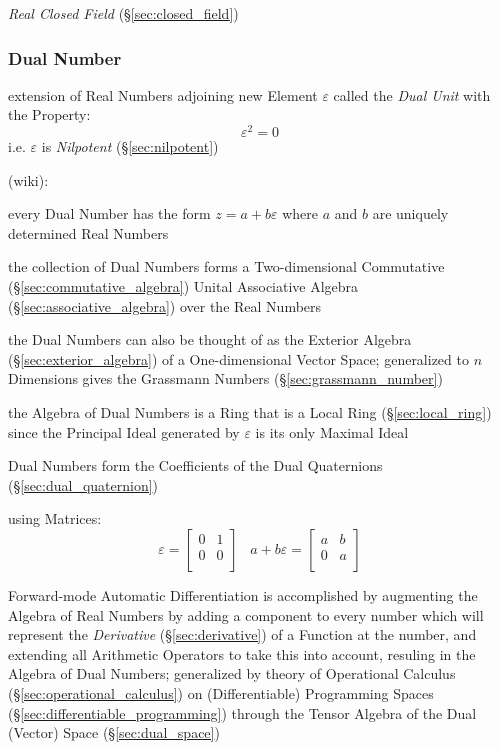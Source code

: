 \emph{Real Closed Field} (\S\ref{sec:closed_field})



\subsubsection{Dual Number}\label{sec:dual_number}

extension of Real Numbers adjoining new Element $\varepsilon$ called the
\emph{Dual Unit} with the Property:
\[
  \varepsilon^2 = 0
\]
i.e. $\varepsilon$ is \emph{Nilpotent} (\S\ref{sec:nilpotent})

(wiki):

every Dual Number has the form $z = a + b\varepsilon$ where $a$ and $b$ are
uniquely determined Real Numbers

the collection of Dual Numbers forms a Two-dimensional Commutative
(\S\ref{sec:commutative_algebra}) Unital Associative Algebra
(\S\ref{sec:associative_algebra}) over the Real Numbers

the Dual Numbers can also be thought of as the Exterior Algebra
(\S\ref{sec:exterior_algebra}) of a One-dimensional Vector Space; generalized to
$n$ Dimensions gives the Grassmann Numbers (\S\ref{sec:grassmann_number})

the Algebra of Dual Numbers is a Ring that is a Local Ring
(\S\ref{sec:local_ring}) since the Principal Ideal generated by $\varepsilon$ is
its only Maximal Ideal

Dual Numbers form the Coefficients of the Dual Quaternions
(\S\ref{sec:dual_quaternion})

using Matrices:
\[
  \varepsilon = \begin{bmatrix}
    0 & 1 \\
    0 & 0 \\
  \end{bmatrix}
  \;\;\;
  a + b\varepsilon = \begin{bmatrix}
    a & b \\
    0 & a \\
  \end{bmatrix}
\]

Forward-mode Automatic Differentiation is accomplished by augmenting the Algebra
of Real Numbers by adding a component to every number which will represent the
\emph{Derivative} (\S\ref{sec:derivative}) of a Function at the number, and
extending all Arithmetic Operators to take this into account, resuling in the
Algebra of Dual Numbers; generalized by theory of Operational Calculus
(\S\ref{sec:operational_calculus}) on (Differentiable) Programming Spaces
(\S\ref{sec:differentiable_programming}) through the Tensor Algebra of the Dual
(Vector) Space (\S\ref{sec:dual_space})



